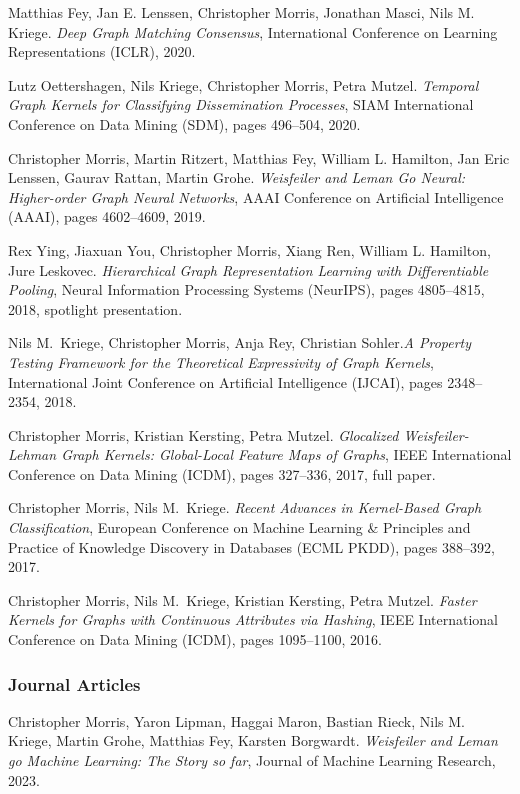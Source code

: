 \documentclass[10pt, a4paper, DIV=12, headings=small]{scrartcl}
\begin{document}
\begin{thebibliography}{15}
	Matthias Fey, Jan E. Lenssen, Christopher Morris, Jonathan Masci, Nils M. Kriege.
	\emph{Deep Graph Matching Consensus},
	International Conference on Learning Representations (ICLR), 2020.

	Lutz Oettershagen, Nils Kriege, Christopher Morris, Petra Mutzel.
	\emph{Temporal Graph Kernels for Classifying Dissemination Processes},
	SIAM International Conference on Data Mining (SDM), pages 496--504, 2020.

	Christopher Morris, Martin Ritzert, Matthias Fey, William L. Hamilton, Jan Eric Lenssen, Gaurav Rattan, Martin Grohe.
	\newblock \emph{Weisfeiler and Leman Go Neural: Higher-order Graph Neural Networks},
	\newblock AAAI Conference on Artificial Intelligence (AAAI), pages 4602--4609, 2019.

	Rex Ying, Jiaxuan You, Christopher Morris, Xiang Ren, William L. Hamilton, Jure Leskovec.
	\emph{Hierarchical Graph Representation Learning with Differentiable Pooling},
	Neural Information Processing Systems (NeurIPS), pages 4805--4815, 2018, spotlight presentation.

	Nils M.~Kriege, Christopher Morris, Anja Rey, Christian Sohler.\footnotemark[2]
	\emph{A Property Testing Framework for the Theoretical Expressivity of Graph Kernels},
	International Joint Conference on Artificial Intelligence (IJCAI), pages 2348--2354, 2018.

	Christopher Morris, Kristian Kersting, Petra Mutzel.
	\emph{Glocalized Weisfeiler-Lehman Graph Kernels: Global-Local Feature Maps of Graphs},
	IEEE International Conference on Data Mining (ICDM), pages 327--336, 2017, full paper.

	Christopher Morris, Nils M.~Kriege.
	\emph{Recent Advances in Kernel-Based Graph Classification},
	European Conference on Machine Learning \& Principles and Practice of Knowledge Discovery in Databases (ECML PKDD), pages 388--392, 2017.

	Christopher Morris, Nils M.~Kriege, Kristian Kersting, Petra Mutzel.
	\emph{Faster Kernels for Graphs with Continuous Attributes via Hashing},
	IEEE International Conference on Data Mining (ICDM), pages 1095--1100, 2016.
	\subsubsection*{Journal Articles}
	Christopher Morris, Yaron Lipman, Haggai Maron, Bastian Rieck, Nils M. Kriege, Martin Grohe, Matthias Fey, Karsten Borgwardt.
	\emph{Weisfeiler and Leman go Machine Learning: The Story so far}, Journal of Machine Learning Research, 2023.


\end{thebibliography}
\end{document}
